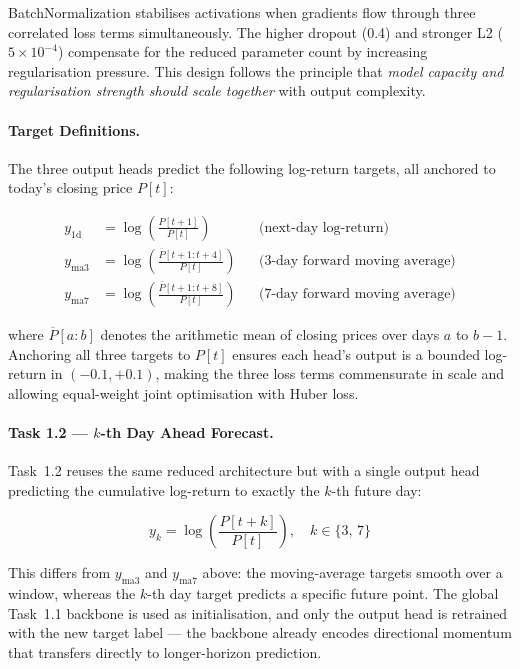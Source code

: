 \documentclass[12pt, a4paper]{article}
\begin{document}
BatchNormalization stabilises activations when gradients flow through
three correlated loss terms simultaneously. The higher dropout (0.4)
and stronger L2 ($5\times10^{-4}$) compensate for the reduced
parameter count by increasing regularisation pressure. This design
follows the principle that \emph{model capacity and regularisation
strength should scale together} with output complexity.

\paragraph{Target Definitions.}
The three output heads predict the following log-return targets,
all anchored to today's closing price $P[t]$:

\begin{align}
y_{\text{1d}}  &= \log\!\left(\frac{P[t+1]}{P[t]}\right)
  & &\text{(next-day log-return)} \label{eq:y1d} \\[4pt]
y_{\text{ma3}} &= \log\!\left(\frac{\overline{P}[t+1:t+4]}{P[t]}\right)
  & &\text{(3-day forward moving average)} \label{eq:yma3} \\[4pt]
y_{\text{ma7}} &= \log\!\left(\frac{\overline{P}[t+1:t+8]}{P[t]}\right)
  & &\text{(7-day forward moving average)} \label{eq:yma7}
\end{align}

where $\overline{P}[a:b]$ denotes the arithmetic mean of closing prices
over days $a$ to $b-1$. Anchoring all three targets to $P[t]$ ensures
each head's output is a bounded log-return in $(-0.1, +0.1)$, making
the three loss terms commensurate in scale and allowing equal-weight
joint optimisation with Huber loss.

\paragraph{Task 1.2 --- $k$-th Day Ahead Forecast.}
Task~1.2 reuses the same reduced architecture but with a single output
head predicting the cumulative log-return to exactly the $k$-th future day:

\begin{equation}
y_k = \log\!\left(\frac{P[t+k]}{P[t]}\right), \quad k \in \{3,\, 7\}
\label{eq:yk}
\end{equation}

This differs from $y_{\text{ma3}}$ and $y_{\text{ma7}}$ above: the
moving-average targets smooth over a window, whereas the $k$-th day
target predicts a specific future point. The global Task~1.1 backbone
is used as initialisation, and only the output head is retrained with
the new target label --- the backbone already encodes directional
momentum that transfers directly to longer-horizon prediction.
\end{document}
